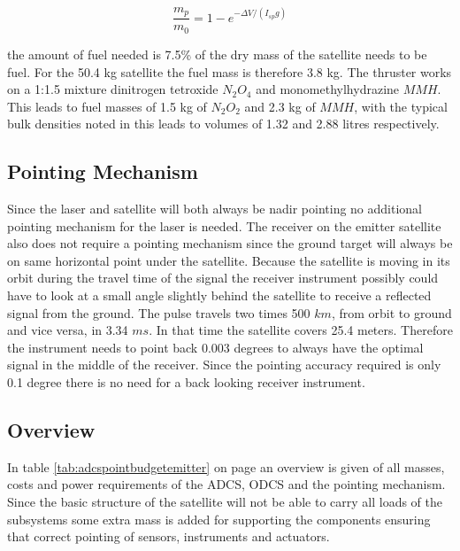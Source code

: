\begin{equation}
\frac{m_p}{m_0} = 1 - e^{-\Delta V/(I_{sp}g)}
\label{fuelratio}
\end{equation}

the amount of fuel needed is 7.5\% of the dry mass of the satellite needs to be fuel. For the 50.4 kg satellite the fuel mass is therefore 3.8 kg. The thruster works on a 1:1.5 mixture dinitrogen tetroxide $N_2O_4$ and monomethylhydrazine $MMH$. This leads to fuel masses of 1.5 kg of $N_2O_2$ and 2.3 kg of $MMH$, with the typical bulk densities noted in \cite{larson} this leads to volumes of 1.32 and 2.88 litres respectively.

\subsection{Pointing Mechanism}
\label{ss:emDDpoint}
Since the \acs{laser} and satellite will both always be nadir pointing no additional pointing mechanism for the \acs{laser} is needed. The receiver on the emitter satellite also does not require a pointing mechanism since the ground target will always be on same horizontal point under the satellite. Because the satellite is moving in its orbit during the travel time of the signal the receiver instrument possibly could have to look at a small angle slightly behind the satellite to receive a reflected signal from the ground. The pulse travels two times 500 $km$, from orbit to ground and vice versa, in 3.34 $ms$. In that time the satellite covers 25.4 meters. Therefore the instrument needs to point back 0.003 degrees to always have the optimal signal in the middle of the receiver. Since the pointing accuracy required is only 0.1 degree there is no need for a back looking receiver instrument.

\subsection{Overview}
\label{ss:emDDoverview}
In table \ref{tab:adcspointbudgetemitter} on page \pageref{tab:adcspointbudgetemitter} an overview is given of all masses, costs and power requirements of the \ac{ADCS}, \ac{ODCS} and the pointing mechanism. Since the basic structure of the satellite will not be able to carry all loads of the subsystems some extra mass is added for supporting the components ensuring that correct pointing of sensors, instruments and actuators.


